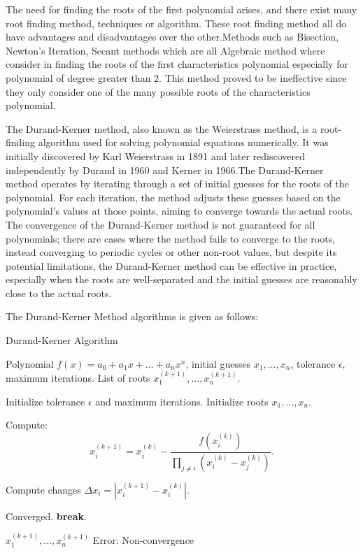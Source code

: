 \documentclass[a4paper, twoside]{report} %
\begin{document}
	The need for finding the roots of the first polynomial arises, and there exist many root finding method, techniques or algorithm. These root finding method all do have advantages and disadvantages over the other.Methods such as Bisection, Newton's Iteration, Secant methods which are all Algebraic method where consider in finding the roots of the first characteristics polynomial especially for polynomial of degree greater than $2$. This method proved to be ineffective since they only consider one of the many possible roots of the characteristics polynomial.

	The Durand-Kerner method, also known as the Weierstrass method, is a root-finding algorithm used for solving polynomial equations numerically. It was initially discovered by Karl Weierstrass in 1891 and later rediscovered independently by Durand in 1960 and Kerner in 1966.The Durand-Kerner method operates by iterating through a set of initial guesses for the roots of the polynomial. For each iteration, the method adjusts these guesses based on the polynomial's values at those points, aiming to converge towards the actual roots. The convergence of the Durand-Kerner method is not guaranteed for all polynomials; there are cases where the method fails to converge to the roots, instead converging to periodic cycles or other non-root values, but despite its potential limitations, the Durand-Kerner method can be effective in practice, especially when the roots are well-separated and the initial guesses are reasonably close to the actual roots.

	The Durand-Kerner Method algorithms is given as follows:

	\begin{algorithm}
		\caption{Durand-Kerner Algorithm}
		\label{alg:durand_kerner}

		\begin{algorithmic}
			\REQUIRE Polynomial \( f(x) = a_0 + a_1 x + \ldots + a_n x^n \), initial guesses \( x_1, \ldots, x_n \), tolerance \( \epsilon \), maximum iterations.
			\ENSURE List of roots \( x_1^{(k+1)}, \ldots, x_n^{(k+1)} \).

			\STATE Initialize tolerance \( \epsilon \) and maximum iterations.
			\STATE Initialize roots \( x_1, \ldots, x_n \).

			\STATE Compute:
			\[
			x_i^{(k+1)} = x_i^{(k)} - \frac{f(x_i^{(k)})}{\prod_{j \neq i} (x_i^{(k)} - x_j^{(k)})}.
			\]
			\ENDFOR

			\STATE Compute changes \( \Delta x_i = |x_i^{(k+1)} - x_i^{(k)}| \).

			\STATE Converged.
			\STATE \textbf{break}.
			\ENDIF

			\ENDFOR

			\RETURN \( x_1^{(k+1)}, \ldots, x_n^{(k+1)} \)
			\ELSE
			\RETURN Error: Non-convergence
			\ENDIF

		\end{algorithmic}
	\end{algorithm}
\end{document}
